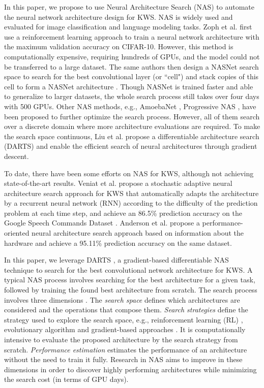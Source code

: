 \documentclass[a4paper]{article}
\begin{document}
In this paper, we propose to use Neural Architecture Search (NAS) to automate the neural network architecture design for KWS. NAS is widely used and evaluated for image classification and language modeling tasks.
Zoph et al. \cite{zoph2016neural} first use a reinforcement learning approach to train a neural network architecture with the maximum validation accuracy on CIFAR-10. However, this method is computationally expensive,  requiring hundreds of GPUs, and the model could not be transferred to a large dataset. 
The same authors then design a NASNet search space to search for the best convolutional layer (or ``cell") and stack copies of this cell to form a NASNet architecture \cite{zoph2018learning}. Though NASNet is trained faster and able to generalize to larger datasets, the whole search process still takes over four days with 500 GPUs. 
Other NAS methods, e.g., AmoebaNet \cite{real2019regularized}, Progressive NAS \cite{liu2018progressive}, have been proposed to further optimize the search process. However, all of them search over a discrete domain where more architecture evaluations are required. 
To make the search space continuous, Liu et al. \cite{liu2018darts} propose a differentiable architecture search (DARTS) and enable the efficient search of neural architectures through gradient descent.

To date, there have been some efforts on NAS for KWS, although not achieving state-of-the-art results. Veniat et al. \cite{veniat2019stochastic} propose a stochastic adaptive neural architecture search approach for KWS that automatically adapts the architecture by a recurrent neural network (RNN) according to the difficulty of the prediction problem at each time step, and achieve an 86.5\% prediction accuracy on the Google Speech Commands Dataset \cite{warden2018speech}. Anderson et al. \cite{anderson2020performance} propose a performance-oriented neural architecture search approach based on information about the hardware and achieve a 95.11\% prediction accuracy on the same dataset.

In this paper, we leverage DARTS \cite{liu2018darts}, a gradient-based differentiable NAS technique to search for the best convolutional network architecture for KWS. 
A typical NAS process involves searching for the best architecture for a given task, followed by training the found best architecture from scratch. The search process involves three dimensions \cite{elsken2018neural}. 
The \textit{search space} defines which architectures are considered and the operations that compose them.
\textit{Search strategies} define the strategy used to explore the search space, e.g., reinforcement learning (RL) \cite{zoph2016neural,zoph2018learning, tan2018mnasnet,pham2018efficient}, evolutionary algorithm \cite{elsken2018efficient, real2017large,real2019regularized} and gradient-based approaches \cite{dong2019searching,liu2018darts, chen2019progressive, xie2018SNAS}. 
It is computationally intensive to evaluate the proposed architecture by the search strategy from scratch. \textit{Performance estimation} estimates the performance of an architecture without the need to train it fully.
Research in NAS aims to improve in these dimensions in order to discover highly performing architectures while minimizing the search cost (in terms of GPU days). 
\end{document}
